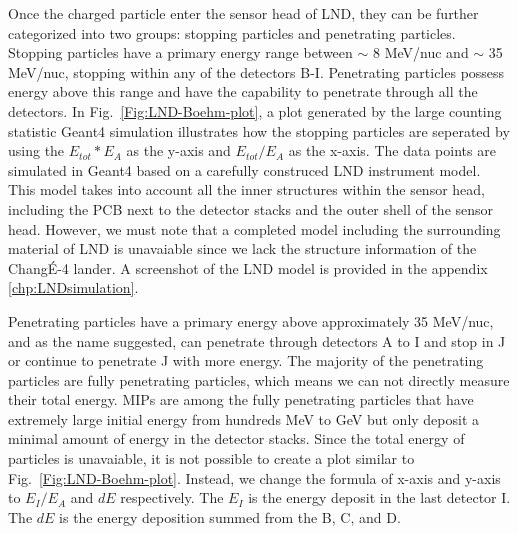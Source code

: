 

Once the charged particle enter the sensor head of \ac{LND}, they can be further categorized into two groups: stopping particles and penetrating particles. Stopping particles have a primary energy range between $\sim$ 8 MeV/nuc and $\sim$ 35 MeV/nuc, stopping within any of the detectors B-I. Penetrating particles possess energy above this range and have the capability to penetrate through all the detectors. In Fig.~\ref{Fig:LND-Boehm-plot}, a plot generated by the large counting statistic \ac{Geant4} \citep{Agostinelli-2003} simulation illustrates how the stopping particles are seperated by using the $E_{tot} * E_A$ as the y-axis and $E_{tot} / E_A$ as the x-axis. The data points are simulated in \ac{Geant4} based on a carefully construced \ac{LND} instrument model. This model takes into account all the inner structures within the sensor head, including the \ac{PCB} next to the detector stacks and the outer shell of the sensor head. However, we must note that a completed model including the surrounding material of \ac{LND} is unavaiable since we lack the structure information of the Chang\'E-4 lander.
A screenshot of the \ac{LND} model is provided in the appendix \ref{chp:LNDsimulation}. 

Penetrating particles have a primary energy above approximately 35 MeV/nuc, and as the name suggested, can penetrate through detectors A to I and stop in J or continue to penetrate J with more energy. The majority of the penetrating particles are fully penetrating particles, which means we can not directly measure their total energy. \acp{MIP} are among the fully penetrating particles that have extremely large initial energy from hundreds MeV to GeV but only deposit a minimal amount of energy in the detector stacks.
Since the total energy of particles is unavaiable, it is not possible to create a plot similar to Fig.~\ref{Fig:LND-Boehm-plot}. Instead, we change the formula of x-axis and y-axis to $E_I/E_A$ and $dE$ respectively. The $E_I$ is the energy deposit in the last detector I. The $dE$ is the energy deposition summed from the B, C, and D.

